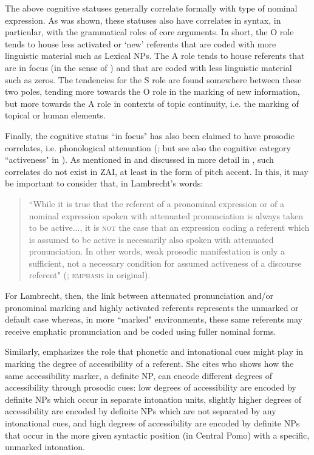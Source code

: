 The above cognitive statuses generally correlate formally with type of nominal expression. As was shown, these statuses also have correlates in syntax, in particular, with the grammatical roles of core arguments. In short, the O role tends to house less activated or `new' referents that are coded with more linguistic material such as Lexical NPs. The A role tends to house referents that are in focus (in the sense of \citealt{gundel1993}) and that are coded with less linguistic material such as zeros. The tendencies for the S role are found somewhere between these two poles, tending more towards the O role in the marking of new information, but more towards the A role in contexts of topic continuity, i.e. the marking of topical or human elements. 

Finally, the cognitive status ``in focus" has also been claimed to have prosodic correlates, i.e. phonological attenuation (\citealt[285]{gundel1993}; but see also the cognitive category ``activeness" in \citealt{lambrecht1994,ariel1990,ariel2001}). As mentioned in  and discussed in more detail in , such correlates do not exist in ZAI, at least in the form of pitch accent. In this, it may be important to consider that, in Lambrecht's words:

\begin{quote} ``While it is true that the referent of a pronominal expression or of a nominal expression spoken with attenuated pronunciation is always taken to be active..., it is \textsc{not} the case that an expression coding a referent which is assumed to be active is necessarily also spoken with attenuated pronunciation. In other words, weak prosodic manifestation is only a sufficient, not a necessary condition for assumed activeness of a discourse referent" (\citealt[97]{lambrecht1994}; \textsc{emphasis} in original).
\end{quote}
 
For Lambrecht, then, the link between attenuated pronunciation and/or pronominal marking and highly activated referents represents the unmarked or default case whereas, in more ``marked" environments, these same referents may receive emphatic pronunciation and be coded using fuller nominal forms.

Similarly, \citet[50]{ariel2001} emphasizes the role that phonetic and intonational cues might play in marking the degree of accessibility of a referent. She cites \citet{mithun1995} who shows how the same accessibility marker, a definite NP, can encode different degrees of accessibility through prosodic cues: low degrees of accessibility are encoded by definite NPs which occur in separate intonation units, slightly higher degrees of accessibility are encoded by definite NPs which are not separated by any intonational cues, and high degrees of accessibility are encoded by definite NPs that occur in the more given syntactic position (in Central Pomo) with a specific, unmarked intonation. 


